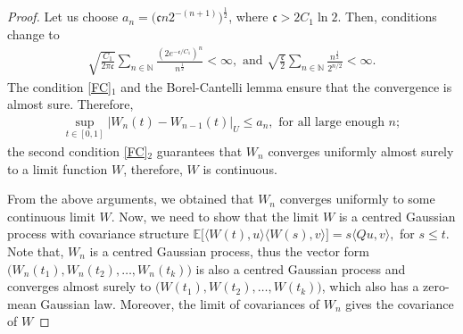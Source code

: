 \documentclass[10pt,a4paper]{amsart}
\newcommand{\N}{\mathbb{N}}
\begin{document}
\begin{proof}
%
%
Let us choose $a_n= \big(\mathfrak{c}n2^{-(n+1)}\big)^{\frac{1}{2}}$, where $\mathfrak{c}>2C_1\ln 2$. Then, conditions change to
\begin{align*}
	\sqrt{\frac{C_1}{2\pi\mathfrak{c}}}\sum_{n\in\N}\frac{(2e^{-\mathfrak{c}/C_1})^n}{n^{\frac{1}{2}}}<\infty, \text{ and }\sqrt{\frac{\mathfrak{c}}{2}}\sum_{n\in\N} \frac{n^{\frac{1}{2}}}{2^{n/2}}<\infty.
\end{align*}
%
The condition \eqref{FC}$_1$ and the Borel-Cantelli lemma ensure that the convergence is almost sure. Therefore, 
\begin{align*}
	\sup_{t\in[0,1]}|W_n(t)-W_{n-1}(t)|_U\leq a_n, \text{ for all large enough }n;
\end{align*}the second condition \eqref{FC}$_2$ guarantees that $W_n$ converges uniformly almost surely to a limit function $W$, therefore, $W$ is continuous.

 From the above arguments, we obtained that $W_n$ converges uniformly to some continuous limit  $W$. Now, we need to show that the limit $W$ is a centred Gaussian process with covariance structure $\mathbb{E}\big[\langle W(t),u\rangle \langle W(s),v\rangle\big]=s\langle Q u,v\rangle,$ for $s\leq t$. Note that, $W_n$ is a centred Gaussian process, thus the vector form $\big(W_n(t_1), W_n(t_2),\dots,W_n(t_k)\big)$ is also a centred Gaussian process and converges almost surely to $\big(W(t_1), W(t_2),\dots,W(t_k)\big)$, which also has a zero-mean Gaussian law. Moreover, the limit of covariances of $W_n$ gives the covariance of $W$
 

\end{proof}
\end{document}
